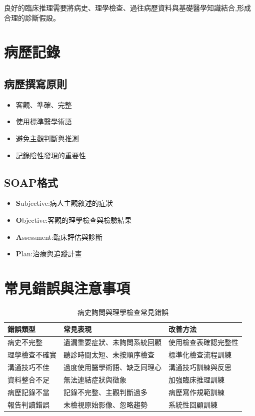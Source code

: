 \documentclass[12pt,a4paper]{article}
\newcommand{\note}[1]{
    \par
    \noindent
    \begin{tcolorbox}[
        colback=emergency_blue!5!white,
        colframe=emergency_blue,
        title=\textbf{重點提醒},
        fonttitle=\bfseries,
        boxrule=0.5pt,
        arc=3pt,
        left=6pt,
        right=6pt,
        top=6pt,
        bottom=6pt
    ]
    #1
    \end{tcolorbox}
}
\begin{document}
\note{
良好的臨床推理需要將病史、理學檢查、過往病歷資料與基礎醫學知識結合,形成合理的診斷假設。
}

\section{病歷記錄}

\subsection{病歷撰寫原則}
\begin{itemize}[nosep]
    \item 客觀、準確、完整
    \item 使用標準醫學術語
    \item 避免主觀判斷與推測
    \item 記錄陰性發現的重要性
\end{itemize}

\subsection{SOAP格式}
\begin{itemize}[nosep]
    \item \textbf{S}ubjective:病人主觀敘述的症狀
    \item \textbf{O}bjective:客觀的理學檢查與檢驗結果
    \item \textbf{A}ssessment:臨床評估與診斷
    \item \textbf{P}lan:治療與追蹤計畫
\end{itemize}

\section{常見錯誤與注意事項}

\begin{table}[h]
    \centering
    \caption{病史詢問與理學檢查常見錯誤}
    \begin{tabular}{p{4cm} p{5cm} p{5cm}}
        \toprule
        \textbf{錯誤類型} & \textbf{常見表現} & \textbf{改善方法} \\
        \midrule
        病史不完整 & 遺漏重要症狀、未詢問系統回顧 & 使用檢查表確認完整性 \\
        理學檢查不確實 & 聽診時間太短、未按順序檢查 & 標準化檢查流程訓練 \\
        溝通技巧不佳 & 過度使用醫學術語、缺乏同理心 & 溝通技巧訓練與反思 \\
        資料整合不足 & 無法連結症狀與徵象 & 加強臨床推理訓練 \\
        病歷記錄不當 & 記錄不完整、主觀判斷過多 & 病歷寫作規範訓練 \\
        報告判讀錯誤 & 未檢視原始影像、忽略趨勢 & 系統性回顧訓練 \\
        \bottomrule
    \end{tabular}
\end{table}
\end{document}
